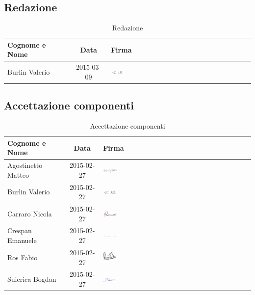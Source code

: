 \subsection{Redazione}

\begin{table}[h]
	\centering
	\begin{tabular}{|l|c|l|}
		\toprule
		\textbf{Cognome e Nome} & \textbf{Data} & \textbf{Firma} \\
		
		\midrule
		Burlin Valerio & 2015-03-09 & \includegraphics[width=0.1\textwidth]{./img/valerio_burlin.png} \\
		
		\bottomrule
	\end{tabular}
	\caption{Redazione}
\end{table}

\subsection{Accettazione componenti}

\begin{table}[h]
	\centering
	\begin{tabular}{|l|c|l|}
		\toprule
		\textbf{Cognome e Nome} & \textbf{Data} & \textbf{Firma} \\
		
		\midrule
		Agostinetto Matteo & 2015-02-27 & \includegraphics[width=0.1\textwidth]{./img/matteo_agostinetto.png} \\
		Burlin Valerio & 2015-02-27 & \includegraphics[width=0.1\textwidth]{./img/valerio_burlin.png} \\ 
		Carraro Nicola & 2015-02-27 & \includegraphics[width=0.1\textwidth]{./img/nicola_carraro.png} \\
		Crespan Emanuele & 2015-02-27 & \includegraphics[width=0.1\textwidth]{./img/emanuele_crespan.png} \\
		Ros Fabio & 2015-02-27 & \includegraphics[width=0.1\textwidth]{./img/fabio_ros.png} \\
		Suierica Bogdan & 2015-02-27 & \includegraphics[width=0.1\textwidth]{./img/bogdan_suierica.png} \\
		
		\bottomrule
	\end{tabular}
	\caption{Accettazione componenti}
\end{table}

